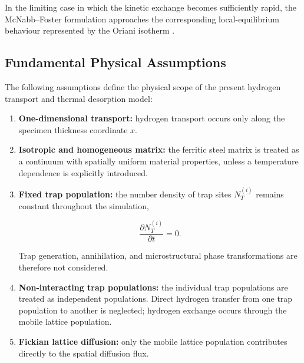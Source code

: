 In the limiting case in which the kinetic exchange becomes
sufficiently rapid, the McNabb--Foster formulation approaches the
corresponding local-equilibrium behaviour represented by the Oriani
isotherm \cite{Turnbull1997,Krom2000}.

\subsection{Fundamental Physical Assumptions}
\label{subsec:physical_assumptions}

The following assumptions define the physical scope of the present
hydrogen transport and thermal desorption model:

\begin{enumerate}

    \item \textbf{One-dimensional transport:}
    hydrogen transport occurs only along the specimen thickness
    coordinate $x$.

    \item \textbf{Isotropic and homogeneous matrix:}
    the ferritic steel matrix is treated as a continuum with spatially
    uniform material properties, unless a temperature dependence is
    explicitly introduced.

    \item \textbf{Fixed trap population:}
    the number density of trap sites $N_T^{(i)}$ remains constant
    throughout the simulation,

    \begin{equation}
    \frac{\partial N_T^{(i)}}{\partial t}=0.
    \label{eq:ch3_constant_trap_density}
    \end{equation}

    Trap generation, annihilation, and microstructural phase
    transformations are therefore not considered.

    \item \textbf{Non-interacting trap populations:}
    the individual trap populations are treated as independent
    populations. Direct hydrogen transfer from one trap population to
    another is neglected; hydrogen exchange occurs through the mobile
    lattice population.

    \item \textbf{Fickian lattice diffusion:}
    only the mobile lattice population contributes directly to the
    spatial diffusion flux.


\end{enumerate}
